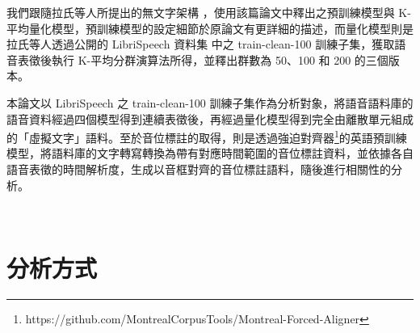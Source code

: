 {        我們跟隨拉氏等人所提出的無文字架構 \cite{lakhotia_generative_2021-1} ，使用該篇論文中釋出之預訓練模型與 K-平均量化模型，預訓練模型的設定細節於原論文有更詳細的描述，而量化模型則是拉氏等人透過公開的 LibriSpeech 資料集 \cite{panayotov_librispeech_2015} 中之 train-clean-100 訓練子集，獲取語音表徵後執行 K-平均分群演算法所得，並釋出群數為 50、100 和 200 的三個版本。

        本論文以 LibriSpeech 之 train-clean-100 訓練子集作為分析對象，將語音語料庫的語音資料經過四個模型得到連續表徵後，再經過量化模型得到完全由離散單元組成的「虛擬文字」語料。至於音位標註的取得，則是透過強迫對齊器\footnote{https://github.com/MontrealCorpusTools/Montreal-Forced-Aligner}的英語預訓練模型，將語料庫的文字轉寫轉換為帶有對應時間範圍的音位標註資料，並依據各自語音表徵的時間解析度，生成以音框對齊的音位標註語料，隨後進行相關性的分析。

}


\section{分析方式}

